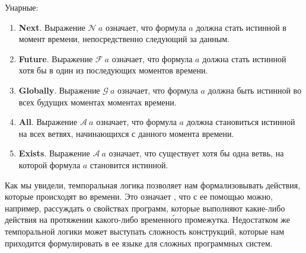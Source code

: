 Унарные:
\begin{enumerate}
  \item \textbf{Next}. Выражение $\mathcal{N}\ a$ означает, что формула $a$ должна стать истинной в момент времени, непосредственно следующий за данным.
  \item \textbf{Future}. Выражение $\mathcal{F}\ a$ означает, что формула $a$ должна стать истинной хотя бы в один из последующих моментов времени.
  \item \textbf{Globally}. Выражение $\mathcal{G}\ a$ означает, что формула $a$ должна быть истинной во всех будущих моментах моментах времени.
  \item \textbf{All}. Выражение $\mathcal{A}\ a$ означает, что формула $a$ должна становиться истинной на всех ветвях, начинающихся с данного момента времени.
  \item \textbf{Exists}. Выражение $\mathcal{A}\ a$ означает, что существует хотя бы одна ветвь, на которой формула $a$ становится истинной.
\end{enumerate}

Как мы увидели, темпоральная логика позволяет нам формализовывать действия, которые происходят во времени. Это означает , что с ее помощью можно, например, рассуждать о свойствах программ, которые выполняют какие-либо действия на протяжении какого-либо временн\'{о}го промежутка. Недостатком же темпоральной логики может выступать сложность конструкций, которые нам приходится формулировать в ее языке для сложных программных систем.
